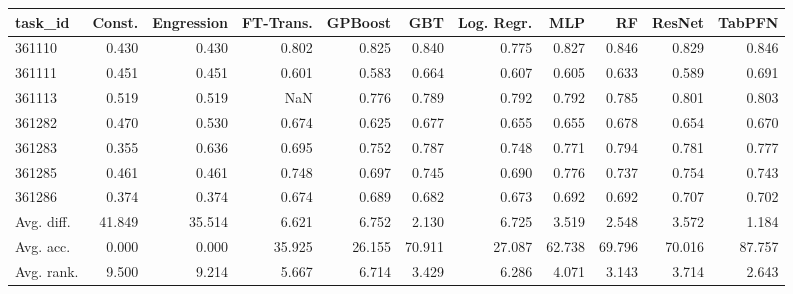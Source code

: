 \begin{tabular}{lrrrrrrrrrr}
\toprule
task\_id & Const. & Engression & FT-Trans. & GPBoost & GBT & Log. Regr. & MLP & RF & ResNet & TabPFN \\
\midrule
361110 & 0.430 & 0.430 & 0.802 & 0.825 & 0.840 & 0.775 & 0.827 & 0.846 & 0.829 & 0.846 \\
361111 & 0.451 & 0.451 & 0.601 & 0.583 & 0.664 & 0.607 & 0.605 & 0.633 & 0.589 & 0.691 \\
361113 & 0.519 & 0.519 & NaN & 0.776 & 0.789 & 0.792 & 0.792 & 0.785 & 0.801 & 0.803 \\
361282 & 0.470 & 0.530 & 0.674 & 0.625 & 0.677 & 0.655 & 0.655 & 0.678 & 0.654 & 0.670 \\
361283 & 0.355 & 0.636 & 0.695 & 0.752 & 0.787 & 0.748 & 0.771 & 0.794 & 0.781 & 0.777 \\
361285 & 0.461 & 0.461 & 0.748 & 0.697 & 0.745 & 0.690 & 0.776 & 0.737 & 0.754 & 0.743 \\
361286 & 0.374 & 0.374 & 0.674 & 0.689 & 0.682 & 0.673 & 0.692 & 0.692 & 0.707 & 0.702 \\
Avg. diff. & 41.849 & 35.514 & 6.621 & 6.752 & 2.130 & 6.725 & 3.519 & 2.548 & 3.572 & 1.184 \\
Avg. acc. & 0.000 & 0.000 & 35.925 & 26.155 & 70.911 & 27.087 & 62.738 & 69.796 & 70.016 & 87.757 \\
Avg. rank. & 9.500 & 9.214 & 5.667 & 6.714 & 3.429 & 6.286 & 4.071 & 3.143 & 3.714 & 2.643 \\
\bottomrule
\end{tabular}
